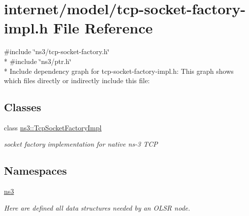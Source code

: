 \hypertarget{tcp-socket-factory-impl_8h}{}\section{internet/model/tcp-\/socket-\/factory-\/impl.h File Reference}
\label{tcp-socket-factory-impl_8h}
{\ttfamily \#include \char`\"{}ns3/tcp-\/socket-\/factory.\+h\char`\"{}}\\*
{\ttfamily \#include \char`\"{}ns3/ptr.\+h\char`\"{}}\\*
Include dependency graph for tcp-\/socket-\/factory-\/impl.h\+:
This graph shows which files directly or indirectly include this file\+:
\subsection*{Classes}
\begin{DoxyCompactItemize}
\item 
class \hyperlink{classns3_1_1TcpSocketFactoryImpl}{ns3\+::\+Tcp\+Socket\+Factory\+Impl}
\begin{DoxyCompactList}\small\item\em socket factory implementation for native ns-\/3 T\+CP \end{DoxyCompactList}\end{DoxyCompactItemize}
\subsection*{Namespaces}
\begin{DoxyCompactItemize}
\item 
 \hyperlink{namespacens3}{ns3}
\begin{DoxyCompactList}\small\item\em Here are defined all data structures needed by an O\+L\+SR node. \end{DoxyCompactList}\end{DoxyCompactItemize}
